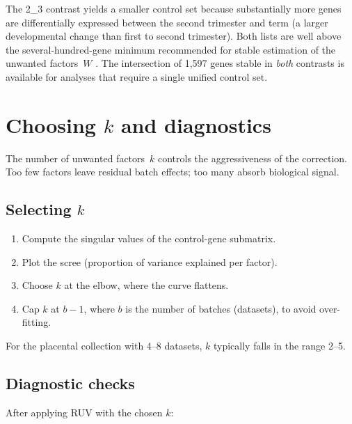 \documentclass[11pt,a4paper]{article}
\begin{document}
The 2\_3 contrast yields a smaller control set because substantially
more genes are differentially expressed between the second trimester
and term (a larger developmental change than first to second
trimester).  Both lists are well above the several-hundred-gene minimum
recommended for stable estimation of the unwanted factors~$W$
\cite{risso2014,gagnonbartsch2012}.  The intersection of 1{,}597 genes
stable in \emph{both} contrasts is available for analyses that require
a single unified control set.


\section{Choosing $k$ and diagnostics}

The number of unwanted factors~$k$ controls the aggressiveness of the
correction.  Too few factors leave residual batch effects; too many
absorb biological signal.

\subsection{Selecting $k$}

\begin{enumerate}
  \item Compute the singular values of the control-gene submatrix.
  \item Plot the scree (proportion of variance explained per factor).
  \item Choose $k$ at the elbow, where the curve flattens.
  \item Cap $k$ at $b - 1$, where $b$ is the number of batches
        (datasets), to avoid over-fitting.
\end{enumerate}

For the placental collection with 4--8 datasets, $k$ typically falls
in the range 2--5.

\subsection{Diagnostic checks}

After applying RUV with the chosen $k$:
\end{document}

